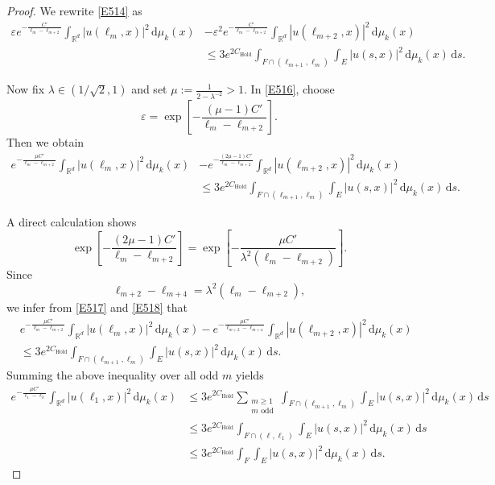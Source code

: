\documentclass[12pt]{article}
\begin{document}
\begin{proof}
We rewrite \eqref{E514} as
\begin{equation}\label{E516}
\begin{aligned}
\varepsilon e^{-\frac{C'}{\ell_m-\ell_{m+2}}} \int_{\mathbb{R}^d} |u(\ell_m,x)|^2 \, \mathrm{d}\mu_k(x)
&- \varepsilon^2 e^{-\frac{C'}{\ell_m-\ell_{m+2}}} \int_{\mathbb{R}^d} |u(\ell_{m+2},x)|^2 \, \mathrm{d}\mu_k(x) \\
&\le 3e^{2C_{\mathrm{Hold}}} \int_{F\cap(\ell_{m+1},\ell_m)} \int_{E} |u(s,x)|^2 \, \mathrm{d}\mu_k(x)\, \mathrm{d}s.
\end{aligned}
\end{equation}

Now fix $\lambda \in (1/\sqrt{2},1)$ and set $\mu := \frac{1}{2-\lambda^{-2}} > 1$. In \eqref{E516}, choose
\[
\varepsilon = \exp\left[-\frac{(\mu-1)C'}{\ell_m-\ell_{m+2}}\right].
\]
Then we obtain
\begin{equation}\label{E517}
\begin{aligned}
e^{-\frac{\mu C'}{\ell_m-\ell_{m+2}}}\int_{\mathbb{R}^d} |u(\ell_m,x)|^2\, \mathrm{d}\mu_k(x)
&- e^{-\frac{(2\mu-1)C'}{\ell_m-\ell_{m+2}}}\int_{\mathbb{R}^d} |u(\ell_{m+2},x)|^2\, \mathrm{d}\mu_k(x) \\
&\le 3e^{2C_{\mathrm{Hold}}}
\int_{F\cap(\ell_{m+1},\ell_m)}\int_{E} |u(s,x)|^2\, \mathrm{d}\mu_k(x)\, \mathrm{d}s.
\end{aligned}
\end{equation}


A direct calculation shows
\begin{equation}\label{E518}
\exp\left[-\frac{(2\mu-1)C'}{\ell_m-\ell_{m+2}}\right]
= \exp\left[-\frac{\mu C'}{\lambda^2(\ell_m-\ell_{m+2})}\right].
\end{equation}
Since
\[
\ell_{m+2}-\ell_{m+4} = \lambda^2(\ell_m-\ell_{m+2}),
\]
we infer from \eqref{E517} and \eqref{E518} that
\[
\begin{aligned}
&e^{-\frac{\mu C'}{\ell_m-\ell_{m+2}}}\int_{\mathbb{R}^d} |u(\ell_m,x)|^2\, \mathrm{d}\mu_k(x)
-e^{-\frac{\mu C'}{\ell_{m+2}-\ell_{m+4}}}\int_{\mathbb{R}^d} |u(\ell_{m+2},x)|^2\, \mathrm{d}\mu_k(x) \\
&\le 3e^{2C_{\mathrm{Hold}}}
\int_{F\cap(\ell_{m+1},\ell_m)}\int_{E} |u(s,x)|^2\, \mathrm{d}\mu_k(x)\, \mathrm{d}s.
\end{aligned}
\]
Summing the above inequality over all odd $m$ yields
\[
\begin{aligned}
e^{-\frac{\mu C'}{\ell_1-\ell_3}}\int_{\mathbb{R}^d} |u(\ell_1,x)|^2\, \mathrm{d}\mu_k(x)
&\le 3e^{2C_{\mathrm{Hold}}}\sum_{\substack{m\ge1\\ m\text{ odd}}}\int_{F\cap(\ell_{m+1},\ell_m)}\int_{E} |u(s,x)|^2\, \mathrm{d}\mu_k(x)\, \mathrm{d}s \\
&\le 3e^{2C_{\mathrm{Hold}}}\int_{F\cap(\ell,\ell_1)}\int_{E} |u(s,x)|^2\, \mathrm{d}\mu_k(x)\, \mathrm{d}s \\
&\le 3e^{2C_{\mathrm{Hold}}}\int_{F}\int_{E} |u(s,x)|^2\, \mathrm{d}\mu_k(x)\, \mathrm{d}s.
\end{aligned}
\]



\end{proof}
\end{document}
